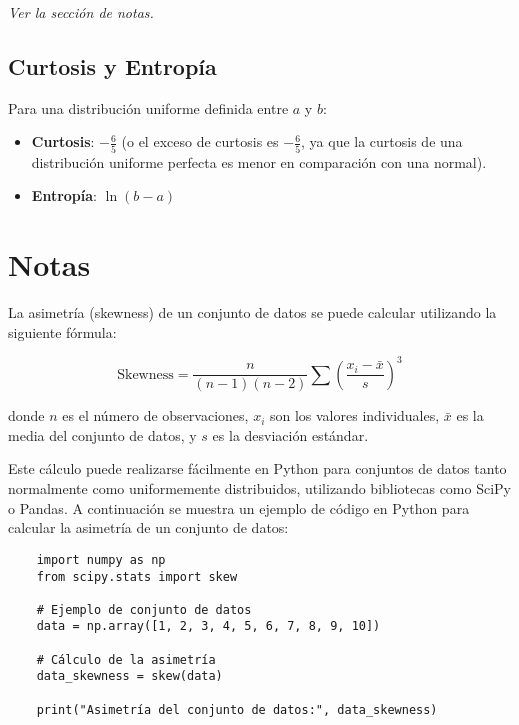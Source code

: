 \documentclass[11pt]{article}
\begin{document}
\textit{Ver la sección de notas.}


\subsection*{Curtosis y Entropía}
Para una distribución uniforme definida entre \(a\) y \(b\):
\begin{itemize}
	\item \textbf{Curtosis}: \(-\frac{6}{5}\) (o el exceso de curtosis es \(-\frac{6}{5}\), ya que la curtosis de una distribución uniforme perfecta es menor en comparación con una normal).
	\item \textbf{Entropía}: \(\ln(b - a)\)
\end{itemize}



\section*{Notas}

La asimetría (skewness) de un conjunto de datos se puede calcular utilizando la siguiente fórmula:

\[ \text{Skewness} = \frac{n}{(n-1)(n-2)} \sum \left(\frac{x_i - \bar{x}}{s}\right)^3 \]

donde \(n\) es el número de observaciones, \(x_i\) son los valores individuales, \(\bar{x}\) es la media del conjunto de datos, y \(s\) es la desviación estándar.

Este cálculo puede realizarse fácilmente en Python para conjuntos de datos tanto normalmente como uniformemente distribuidos, utilizando bibliotecas como SciPy o Pandas. A continuación se muestra un ejemplo de código en Python para calcular la asimetría de un conjunto de datos:

\begin{verbatim}
	import numpy as np
	from scipy.stats import skew
	
	# Ejemplo de conjunto de datos
	data = np.array([1, 2, 3, 4, 5, 6, 7, 8, 9, 10])
	
	# Cálculo de la asimetría
	data_skewness = skew(data)
	
	print("Asimetría del conjunto de datos:", data_skewness)
\end{verbatim}
\end{document}

